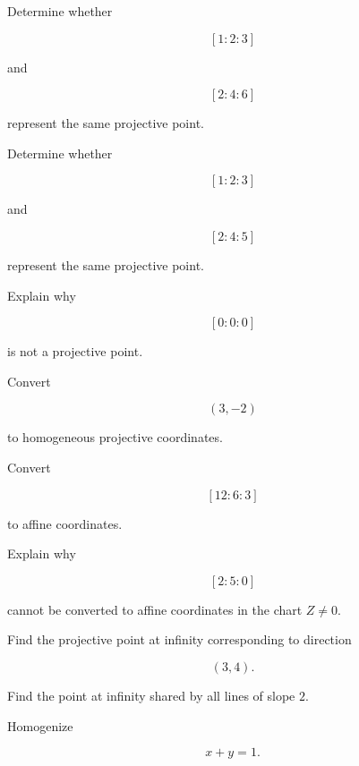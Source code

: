 \begin{exercise}[1]
Determine whether

\[
[1:2:3]
\]

and

\[
[2:4:6]
\]

represent the same projective point.
\end{exercise}

\begin{exercise}[1]
Determine whether

\[
[1:2:3]
\]

and

\[
[2:4:5]
\]

represent the same projective point.
\end{exercise}

\begin{exercise}[1]
Explain why

\[
[0:0:0]
\]

is not a projective point.
\end{exercise}

\begin{exercise}[1]
Convert

\[
(3,-2)
\]

to homogeneous projective coordinates.
\end{exercise}

\begin{exercise}[1]
Convert

\[
[12:6:3]
\]

to affine coordinates.
\end{exercise}

\begin{exercise}[1]
Explain why

\[
[2:5:0]
\]

cannot be converted to affine coordinates in the chart \(Z\neq0\).
\end{exercise}

\begin{exercise}[2]
Find the projective point at infinity corresponding to direction

\[
(3,4).
\]
\end{exercise}

\begin{exercise}[2]
Find the point at infinity shared by all lines of slope \(2\).
\end{exercise}

\begin{exercise}[2]
Homogenize

\[
x+y=1.
\]
\end{exercise}

